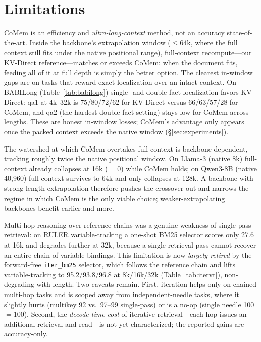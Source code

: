 \section{Limitations}
\label{sec:limitations}

CoMem is an efficiency and \emph{ultra-long-context} method, not an
accuracy state-of-the-art. Inside the backbone's extrapolation window
($\le$64k, where the full context still fits under the native positional
range), full-context recompute---our KV-Direct reference---matches or
exceeds CoMem: when the document fits, feeding all of it at full depth is
simply the better option. The clearest in-window gaps are on tasks that
reward exact localization over an intact context. On BABILong
(Table~\ref{tab:babilong}) single- and double-fact localization favors
KV-Direct: qa1 at 4k--32k is 75/80/72/62 for KV-Direct versus 66/63/57/28
for CoMem, and qa2 (the hardest double-fact setting) stays low for CoMem
across lengths. These are honest in-window losses; CoMem's advantage only
appears once the packed context exceeds the native window (\S\ref{sec:experiments}).

The watershed at which CoMem overtakes full context is backbone-dependent,
tracking roughly twice the native positional window. On Llama-3
\citep{llama3} (native 8k) full-context already collapses at 16k
($=$0) while CoMem holds; on Qwen3-8B \citep{qwen3} (native 40{,}960)
full-context survives to 64k and only collapses at 128k. A backbone with
strong length extrapolation therefore pushes the crossover out and narrows
the regime in which CoMem is the only viable choice; weaker-extrapolating
backbones benefit earlier and more.

Multi-hop reasoning over reference chains was a genuine weakness of
single-pass retrieval: on RULER variable-tracking a one-shot BM25 selector
scores only 27.6 at 16k and degrades further at 32k, because a single
retrieval pass cannot recover an entire chain of variable bindings. This
limitation is now \emph{largely retired} by the forward-free
\texttt{iter\_bm25} selector, which follows the reference chain and lifts
variable-tracking to 95.2/93.8/96.8 at 8k/16k/32k (Table~\ref{tab:itervt}),
non-degrading with length. Two caveats remain. First, iteration helps only
on chained multi-hop tasks and is scoped away from independent-needle tasks,
where it slightly hurts (multikey 92 vs.\ 97--99 single-pass) or is a no-op
(single needle 100$=$100). Second, the \emph{decode-time cost} of iterative
retrieval---each hop issues an additional retrieval and read---is not yet
characterized; the reported gains are accuracy-only.

